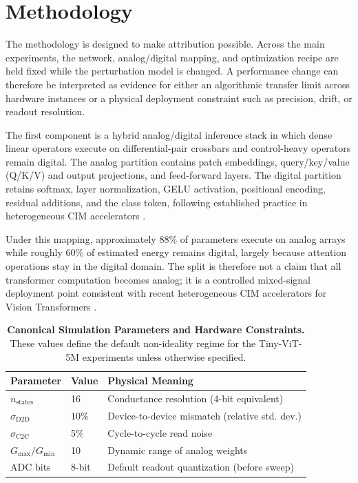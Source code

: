 \section{Methodology}
\label{sec:methodology}

The methodology is designed to make attribution possible. Across the main experiments, the network, analog/digital mapping, and optimization recipe are held fixed while the perturbation model is changed. A performance change can therefore be interpreted as evidence for either an algorithmic transfer limit across hardware instances or a physical deployment constraint such as precision, drift, or readout resolution.

The first component is a hybrid analog/digital inference stack in which dense linear operators execute on differential-pair crossbars and control-heavy operators remain digital. The analog partition contains patch embeddings, query/key/value (Q/K/V) and output projections, and feed-forward layers. The digital partition retains softmax, layer normalization, GELU activation, positional encoding, residual additions, and the class token, following established practice in heterogeneous CIM accelerators \citep{wu2023bwq,wang2024epim,ge2024allspark,wang2025hemlet,liu2024hardsea}.

Under this mapping, approximately 88\% of parameters execute on analog arrays while roughly 60\% of estimated energy remains digital, largely because attention operations stay in the digital domain. The split is therefore not a claim that all transformer computation becomes analog; it is a controlled mixed-signal deployment point consistent with recent heterogeneous CIM accelerators for Vision Transformers \citep{liu2024hardsea,wang2024epim,ge2024allspark,wang2025hemlet}.

\begin{table}[htbp]
\centering
\caption{\textbf{Canonical Simulation Parameters and Hardware Constraints.} These values define the default non-ideality regime for the Tiny-ViT-5M experiments unless otherwise specified.}
\label{tab:hardware_constraints}
\begin{tabular}{lll}
\toprule
\textbf{Parameter} & \textbf{Value} & \textbf{Physical Meaning} \\
\midrule
$n_{\mathrm{states}}$ & 16 & Conductance resolution (4-bit equivalent) \\
$\sigma_{\mathrm{D2D}}$ & 10\% & Device-to-device mismatch (relative std. dev.) \\
$\sigma_{\mathrm{C2C}}$ & 5\% & Cycle-to-cycle read noise \\
$G_{\max}/G_{\min}$ & 10 & Dynamic range of analog weights \\
ADC bits & 8-bit & Default readout quantization (before sweep) \\
\bottomrule
\end{tabular}
\end{table}

